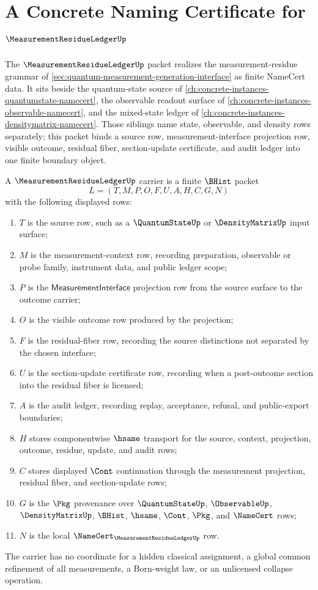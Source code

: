 \chapter{A Concrete Naming Certificate for $\MeasurementResidueLedgerUp$}
\label{ch:concrete-instances-measurement-residue-ledger-namecert}

The $\MeasurementResidueLedgerUp$ packet realizes the measurement-residue grammar of \autoref{sec:quantum-measurement-generation-interface} as finite NameCert data. It sits beside the quantum-state source of \autoref{ch:concrete-instances-quantumstate-namecert}, the observable readout surface of \autoref{ch:concrete-instances-observable-namecert}, and the mixed-state ledger of \autoref{ch:concrete-instances-densitymatrix-namecert}. Those siblings name state, observable, and density rows separately; this packet binds a source row, measurement-interface projection row, visible outcome, residual fiber, section-update certificate, and audit ledger into one finite boundary object.

\begin{definition}
\label{def:measurement-residue-ledger-carrier}
A $\MeasurementResidueLedgerUp$ carrier is a finite $\BHist$ packet
$$
L=(T,M,P,O,F,U,A,H,C,G,N)
$$
with the following displayed rows:
\begin{enumerate}
\item $T$ is the source row, such as a $\QuantumStateUp$ or $\DensityMatrixUp$ input surface;
\item $M$ is the measurement-context row, recording preparation, observable or probe family, instrument data, and public ledger scope;
\item $P$ is the $\mathsf{MeasurementInterface}$ projection row from the source surface to the outcome carrier;
\item $O$ is the visible outcome row produced by the projection;
\item $F$ is the residual-fiber row, recording the source distinctions not separated by the chosen interface;
\item $U$ is the section-update certificate row, recording when a post-outcome section into the residual fiber is licensed;
\item $A$ is the audit ledger, recording replay, acceptance, refusal, and public-export boundaries;
\item $H$ stores componentwise $\hsame$ transport for the source, context, projection, outcome, residue, update, and audit rows;
\item $C$ stores displayed $\Cont$ continuation through the measurement projection, residual fiber, and section-update rows;
\item $G$ is the $\Pkg$ provenance over $\QuantumStateUp$, $\ObservableUp$, $\DensityMatrixUp$, $\BHist$, $\hsame$, $\Cont$, $\Pkg$, and $\NameCert$ rows;
\item $N$ is the local $\NameCert_{\MeasurementResidueLedgerUp}$ row.
\end{enumerate}
The carrier has no coordinate for a hidden classical assignment, a global common refinement of all measurements, a Born-weight law, or an unlicensed collapse operation.
\end{definition}

